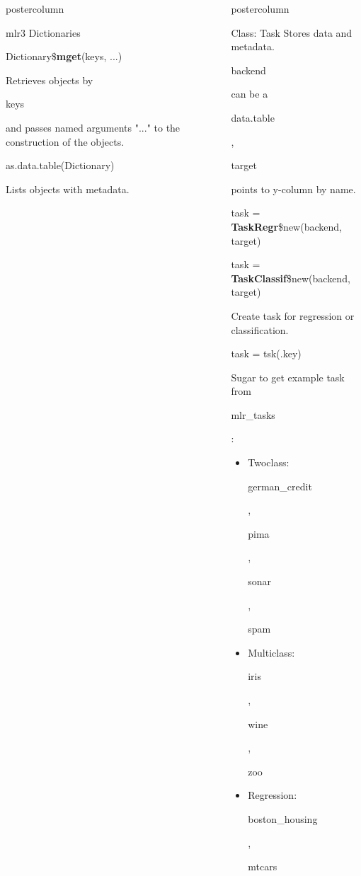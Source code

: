 \documentclass{beamer}
\newlength{\columnheight} %
\newcommand{\codeinline}[1]{\begin{codeboxinline}#1\end{codeboxinline}}
\begin{document}
\begin{frame}[fragile]{}
\begin{columns}
\begin{column}{.245\textwidth}
\begin{beamercolorbox}[center]{postercolumn}
\begin{minipage}{.98\textwidth}
{\begin{myblock}{mlr3 Dictionaries}
							\\
							\begin{codebox}
								Dictionary\$\textbf{mget}(keys, ...)
							\end{codebox}
							Retrieves objects by \codeinline{keys} and
							passes named arguments "..." to the construction of the objects.
							\\
							\begin{codebox}
								as.data.table(Dictionary)
							\end{codebox}
							Lists objects with metadata.
						\end{myblock}
						\vfill}
				\end{minipage}
			\end{beamercolorbox}
		\end{column}
		\begin{column}{.245\textwidth}
			\begin{beamercolorbox}[center]{postercolumn}
				\begin{minipage}{.98\textwidth}
					\parbox[t][\columnheight]{\textwidth}{
						\begin{myblock}{Class: Task}
							Stores data and metadata. \codeinline{backend} can be a \codeinline{data.table},
							\codeinline{target} points to y-column by name.
							\\
							\begin{codebox}
								task = \textbf{TaskRegr}\$new(backend, target)
							\end{codebox}
							\begin{codebox}
								task = \textbf{TaskClassif}\$new(backend, target)
							\end{codebox}
							Create task for regression or classification.
							\\
							\begin{codebox}
								task = tsk(.key)
							\end{codebox}
							Sugar to get example task from \codeinline{mlr\_tasks}:
							\\
							\begin{itemize}
								\item Twoclass: \codeinline{german\_credit}, \codeinline{pima}, \codeinline{sonar},
								      \codeinline{spam}
								\item Multiclass: \codeinline{iris}, \codeinline{wine}, \codeinline{zoo}
								\item Regression: \codeinline{boston\_housing}, \codeinline{mtcars}
							\end{itemize}

\end{myblock}}
\end{minipage}
\end{beamercolorbox}
\end{column}
\end{columns}
\end{frame}
\end{document}
